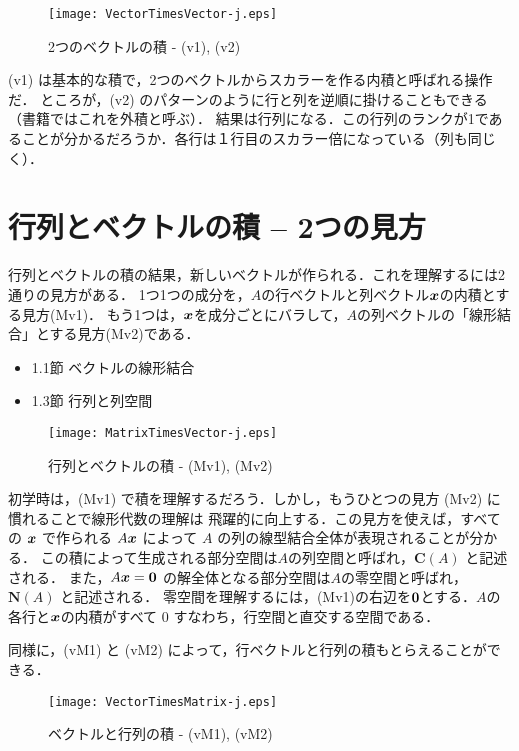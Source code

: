 \documentclass[letterpaper]{article}
\newcommand{\bi}[1]{\hbox{\boldmath$#1$}}
\begin{document}
\begin{figure}[H]
  \centering
  \texttt{[image: VectorTimesVector-j.eps]}
  \caption{2つのベクトルの積 - (v1), (v2)}
\end{figure}

(v1) は基本的な積で，2つのベクトルからスカラーを作る内積と呼ばれる操作だ．
ところが，(v2) のパターンのように行と列を逆順に掛けることもできる（書籍ではこれを外積と呼ぶ）．
結果は行列になる．この行列のランクが1であることが分かるだろうか．各行は１行目のスカラー倍になっている（列も同じく）．

\section{行列とベクトルの積 -- 2つの見方}

行列とベクトルの積の結果，新しいベクトルが作られる．これを理解するには2通りの見方がある．
1つ1つの成分を，$A$の行ベクトルと列ベクトル$\bi{x}$の内積とする見方(Mv1)．
もう1つは，$\bi{x}$を成分ごとにバラして，$A$の列ベクトルの「線形結合」とする見方(Mv2)である．

\begin{itemize}
  \item 1.1節 ベクトルの線形結合
  \item 1.3節 行列と列空間
\end{itemize} 

\begin{figure}[H]
  \texttt{[image: MatrixTimesVector-j.eps]}
  \caption{行列とベクトルの積 - (Mv1), (Mv2)}
\end{figure}

初学時は，(Mv1) で積を理解するだろう．しかし，もうひとつの見方 (Mv2) に慣れることで線形代数の理解は
飛躍的に向上する．この見方を使えば，すべての $\bi{x}$ で作られる $A\bi{x}$ によって $A$ の列の線型結合全体が表現されることが分かる．
この積によって生成される部分空間は$A$の列空間と呼ばれ，$\mathbf{C}(A)$ と記述される．
また，$A\bi{x}=\bi{0}$ の解全体となる部分空間は$A$の零空間と呼ばれ，$\mathbf{N}(A)$ と記述される．
零空間を理解するには，(Mv1)の右辺を$\bi{0}$とする．$A$の各行と$\bi{x}$の内積がすべて $0$ すなわち，行空間と直交する空間である．

同様に，(vM1) と (vM2) によって，行ベクトルと行列の積もとらえることができる．

\begin{figure}[H]
  \texttt{[image: VectorTimesMatrix-j.eps]}
  \caption{ベクトルと行列の積 - (vM1), (vM2)}
\end{figure}
\end{document}

